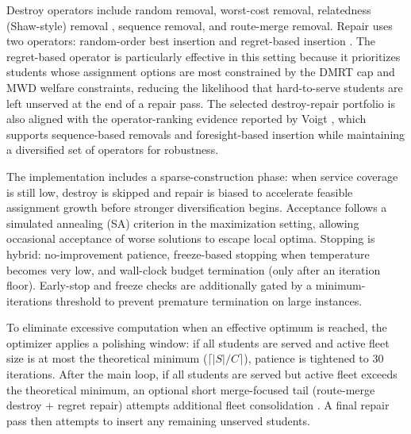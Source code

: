 \documentclass[journal]{IEEEtran}
\begin{document}
Destroy operators include random removal, worst-cost removal,
relatedness (Shaw-style) removal \cite{c19}, sequence removal, and
route-merge removal. Repair uses two operators: random-order best
insertion and regret-based insertion \cite{c9}. The regret-based
operator is particularly effective in this setting because it
prioritizes students whose assignment options are most constrained
by the DMRT cap and MWD welfare constraints, reducing the
likelihood that hard-to-serve students are left unserved at the
end of a repair pass. The selected destroy-repair portfolio is also 
aligned with the operator-ranking evidence reported by Voigt 
\cite{c22}, which supports sequence-based removals and 
foresight-based insertion while maintaining a diversified set of 
operators for robustness.

The implementation includes a sparse-construction phase: when 
service coverage is still low, destroy is skipped and repair is 
biased to accelerate feasible assignment growth before stronger 
diversification begins. Acceptance follows a simulated annealing
(SA) criterion \cite{c20} in the maximization setting, allowing
occasional acceptance of worse solutions to escape local optima. 
Stopping is hybrid: no-improvement patience, freeze-based stopping 
when temperature becomes very low, and wall-clock budget termination 
(only after an iteration floor). Early-stop and freeze checks are 
additionally gated by a minimum-iterations threshold to prevent 
premature termination on large instances.

To eliminate excessive computation when an effective optimum is 
reached, the optimizer applies a polishing window: if all students 
are served and active fleet size is at most the theoretical minimum 
($\lceil |S| / C \rceil$), patience is tightened to 30 iterations. 
After the main loop, if all students are served but active fleet 
exceeds the theoretical minimum, an optional short merge-focused 
tail (route-merge destroy + regret repair) attempts additional 
fleet consolidation \cite{c15}. A final repair pass then attempts 
to insert any remaining unserved students.
\end{document}
